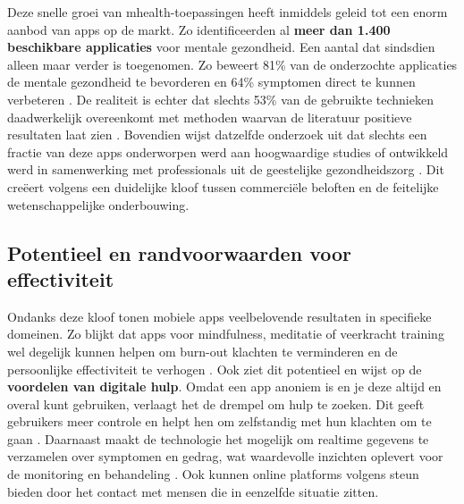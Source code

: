 \vspace{1em}

Deze snelle groei van \acrshort{mhealth}-toepassingen heeft inmiddels geleid tot een enorm aanbod van apps op de markt. Zo identificeerden \textcite{Larsen2019} al \textbf{meer dan 1.400 beschikbare applicaties} voor mentale gezondheid. Een aantal dat sindsdien alleen maar verder is toegenomen. Zo beweert 81\% van de onderzochte applicaties de mentale gezondheid te bevorderen en 64\% symptomen direct te kunnen verbeteren \autocite{Larsen2019}. De realiteit is echter dat slechts 53\% van de gebruikte technieken daadwerkelijk overeenkomt met methoden waarvan de literatuur positieve resultaten laat zien \autocite{Larsen2019}. Bovendien wijst datzelfde onderzoek uit dat slechts een fractie van deze apps onderworpen werd aan hoogwaardige studies of ontwikkeld werd in samenwerking met professionals uit de geestelijke gezondheidszorg \autocite{Larsen2019}. Dit creëert volgens \textcite{Larsen2019} een duidelijke kloof tussen commerciële beloften en de feitelijke wetenschappelijke onderbouwing.

\vspace{1em}

\subsection{Potentieel en randvoorwaarden voor effectiviteit}
\label{subsec:potentieel-en-randvoorwaarden}

\vspace{1em}

Ondanks deze kloof tonen mobiele apps veelbelovende resultaten in specifieke domeinen. Zo blijkt dat apps voor mindfulness, meditatie of veerkracht training wel degelijk kunnen helpen om burn-out klachten te verminderen en de persoonlijke effectiviteit te verhogen \autocite{Deriglazov2025}. Ook \textcite{keuning2020ehealth} ziet dit potentieel en wijst op de \textbf{voordelen van digitale hulp}. Omdat een app anoniem is en je deze altijd en overal kunt gebruiken, verlaagt het de drempel om hulp te zoeken. Dit geeft gebruikers meer controle en helpt hen om zelfstandig met hun klachten om te gaan \autocite{keuning2020ehealth}. Daarnaast maakt de technologie het mogelijk om realtime gegevens te verzamelen over symptomen en gedrag, wat waardevolle inzichten oplevert voor de monitoring en behandeling \autocite{Khosravi2024}. Ook kunnen online platforms volgens \textcite{Moock2014} steun bieden door het contact met mensen die in eenzelfde situatie zitten.

